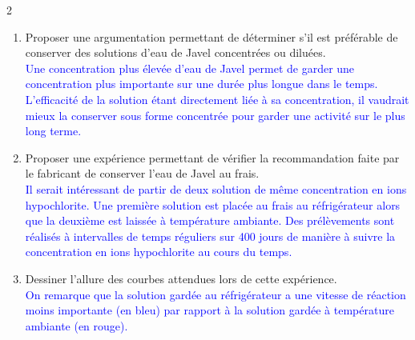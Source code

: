 \documentclass[a4paper,11pt,fleqn]{article}%
\begin{document}
\begin{multicols}{2}
\begin{enumerate}
    \item Proposer une argumentation permettant de déterminer s'il est préférable de conserver des solutions d'eau de Javel concentrées ou diluées.\\
    \textcolor{blue}{Une concentration plus élevée d'eau de Javel permet de garder une concentration plus importante sur une durée plus longue dans le temps. L'efficacité de la solution étant directement liée à sa concentration, il vaudrait mieux la conserver sous forme concentrée pour garder une activité sur le plus long terme.}
    \item Proposer une expérience permettant de vérifier la recommandation faite par le fabricant de conserver l'eau de Javel au frais.\\
    \textcolor{blue}{Il serait intéressant de partir de deux solution de même concentration en ions hypochlorite. Une première solution est placée au frais au réfrigérateur alors que la deuxième est laissée à température ambiante. Des prélèvements sont réalisés à intervalles de temps réguliers sur 400 jours de manière à suivre la concentration en ions hypochlorite au cours du temps.}
    \item Dessiner l'allure des courbes attendues lors de cette expérience.\\
    \textcolor{blue}{On remarque que la solution gardée au réfrigérateur a une vitesse de réaction moins importante (en bleu) par rapport à la solution gardée à température ambiante (en rouge).}
\end{enumerate}


\end{multicols}
\end{document}
